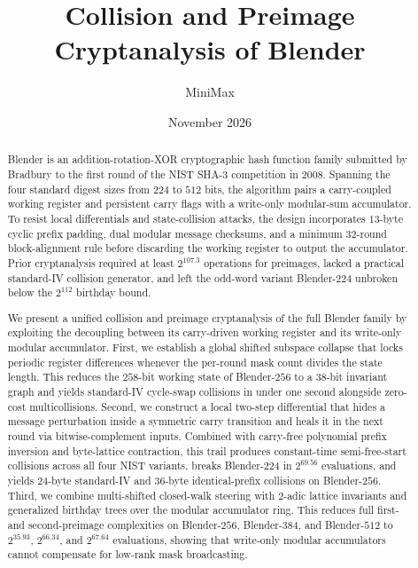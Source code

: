 \documentclass[11pt,a4paper]{article}
\title{\bfseries Collision and Preimage Cryptanalysis of Blender}
\author{MiniMax}
\date{November 2026}
\theoremstyle{definition}
\theoremstyle{remark}
\begin{document}
\maketitle

\begin{abstract}
Blender is an addition-rotation-XOR cryptographic hash function family submitted by Bradbury to the first round of the NIST SHA-3 competition in 2008. Spanning the four standard digest sizes from $224$ to $512$ bits, the algorithm pairs a carry-coupled working register and persistent carry flags with a write-only modular-sum accumulator. To resist local differentials and state-collision attacks, the design incorporates $13$-byte cyclic prefix padding, dual modular message checksums, and a minimum $32$-round block-alignment rule before discarding the working register to output the accumulator. Prior cryptanalysis required at least $2^{107.3}$ operations for preimages, lacked a practical standard-IV collision generator, and left the odd-word variant Blender-$224$ unbroken below the $2^{112}$ birthday bound.

We present a unified collision and preimage cryptanalysis of the full Blender family by exploiting the decoupling between its carry-driven working register and its write-only modular accumulator. First, we establish a global shifted subspace collapse that locks periodic register differences whenever the per-round mask count divides the state length. This reduces the $258$-bit working state of Blender-$256$ to a $38$-bit invariant graph and yields standard-IV cycle-swap collisions in under one second alongside zero-cost multicollisions. Second, we construct a local two-step differential that hides a message perturbation inside a symmetric carry transition and heals it in the next round via bitwise-complement inputs. Combined with carry-free polynomial prefix inversion and byte-lattice contraction, this trail produces constant-time semi-free-start collisions across all four NIST variants, breaks Blender-$224$ in $2^{69.56}$ evaluations, and yields $24$-byte standard-IV and $36$-byte identical-prefix collisions on Blender-$256$. Third, we combine multi-shifted closed-walk steering with $2$-adic lattice invariants and generalized birthday trees over the modular accumulator ring. This reduces full first- and second-preimage complexities on Blender-$256$, Blender-$384$, and Blender-$512$ to $2^{35.93}$, $2^{66.34}$, and $2^{67.64}$ evaluations, showing that write-only modular accumulators cannot compensate for low-rank mask broadcasting.
\end{abstract}
\end{document}
